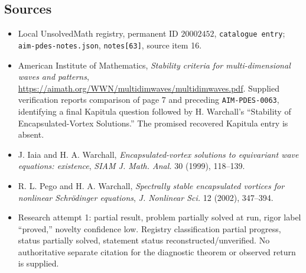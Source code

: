 \documentclass[11pt]{article}
\begin{document}
\subsection{Sources}
\begin{itemize}
\item Local UnsolvedMath registry, permanent ID $20002452$, \texttt{catalogue entry}; \texttt{aim-pdes-notes.json}, \texttt{notes[63]}, source item 16.
\item American Institute of Mathematics, \emph{Stability criteria for multi-dimensional waves and patterns}, \url{https://aimath.org/WWN/multidimwaves/multidimwaves.pdf}. Supplied verification reports comparison of page 7 and preceding \texttt{AIM-PDES-0063}, identifying a final Kapitula question followed by H. Warchall's ``Stability of Encapsulated-Vortex Solutions.'' The promised recovered Kapitula entry is absent.
\item J. Iaia and H. A. Warchall, \emph{Encapsulated-vortex solutions to equivariant wave equations: existence}, \emph{SIAM J. Math. Anal.} 30 (1999), 118--139.
\item R. L. Pego and H. A. Warchall, \emph{Spectrally stable encapsulated vortices for nonlinear Schr\"odinger equations}, \emph{J. Nonlinear Sci.} 12 (2002), 347--394.
\item Research attempt 1: partial result, problem partially solved at run, rigor label ``proved,'' novelty confidence low. Registry classification partial progress, status partially solved, statement status reconstructed/unverified. No authoritative separate citation for the diagnostic theorem or observed return is supplied.
\end{itemize}
\end{document}
